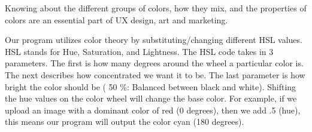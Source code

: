 \documentclass[letterpaper,10pt,english,openany,oneside]{sphinxmanual}
\begin{document}
\sphinxAtStartPar
Knowing about the different groups of colors, how they mix, and the properties of colors are an essential part of UX design, art and marketing.

\sphinxAtStartPar
{}

\sphinxAtStartPar
Our program utilizes color theory by substituting/changing different HSL values. HSL stands for Hue, Saturation, and Lightness. The HSL code takes in 3 parameters. The first is how many degrees around the wheel a particular color is. The next describes how concentrated we want it to be. The last parameter is how bright the color should be ( 50 \%: Balanced between black and white). Shifting the hue values on the color wheel will change the base color. For example, if we upload an image with a dominant color of red (0 degrees), then we add .5 (hue), this means our program will output the color cyan (180 degrees).



\renewcommand{\indexname}{Index}
\printindex
\end{document}
